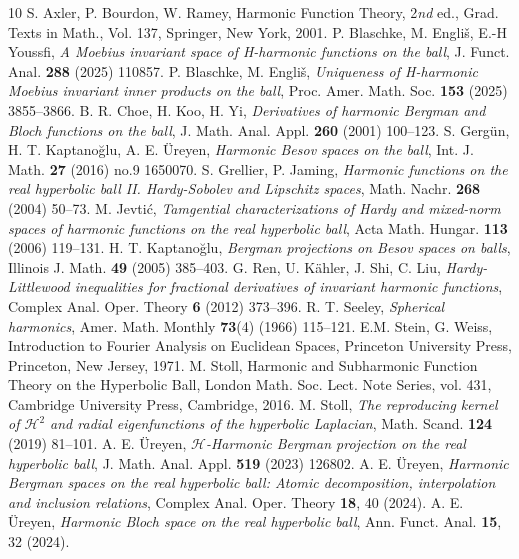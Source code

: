 \documentclass{amsart}
\theoremstyle{definition}
\theoremstyle{remark}
\begin{document}
\begin{thebibliography}{10}
%
S. Axler, P. Bourdon, W. Ramey,
Harmonic Function Theory,
2\textit{nd} ed., Grad. Texts in Math., Vol. 137, Springer, New York, 2001.
%
P. Blaschke, M. Engli\v{s}, E.-H Youssfi,
\textit{A Moebius invariant space of H-harmonic functions on the ball},
J. Funct. Anal. \textbf{288} (2025) 110857.
%
P. Blaschke, M. Engli\v{s},
\textit{Uniqueness of H-harmonic Moebius invariant inner products on the ball},
Proc. Amer. Math. Soc. \textbf{153} (2025) 3855--3866.
%
B. R. Choe, H. Koo, H. Yi,
\textit{Derivatives of harmonic Bergman and Bloch functions on the ball},
J. Math. Anal. Appl. \textbf{260} (2001) 100--123.
%
S. Gerg\"{u}n, H. T. Kaptano\u glu, A. E. \"Ureyen,
\textit{Harmonic Besov spaces on the ball},
Int. J. Math. \textbf{27} (2016) no.9 1650070.
%
S. Grellier, P. Jaming,
\textit{Harmonic functions on the real hyperbolic ball II.
Hardy-Sobolev and Lipschitz spaces},
Math. Nachr. \textbf{268} (2004) 50--73.
%
M. Jevti\'{c},
\textit{Tamgential characterizations of Hardy and mixed-norm
spaces of harmonic functions on the real hyperbolic ball},
Acta Math. Hungar. \textbf{113} (2006) 119--131.
%
H. T. Kaptano\u glu,
\textit{Bergman projections on Besov spaces on balls},
Illinois J. Math. \textbf{49} (2005) 385--403.
%
G. Ren, U. K\"{a}hler, J. Shi, C. Liu,
\textit{Hardy-Littlewood inequalities for fractional derivatives
of invariant harmonic functions},
Complex Anal. Oper. Theory \textbf{6} (2012) 373--396.
%
R. T. Seeley,
\textit{Spherical harmonics},
Amer. Math. Monthly \textbf{73}(4) (1966) 115--121.
%
E.M. Stein, G. Weiss,
Introduction to Fourier Analysis on Euclidean Spaces,
Princeton University Press, Princeton, New Jersey, 1971.
%
M. Stoll,
Harmonic and Subharmonic Function Theory on the Hyperbolic Ball,
London Math. Soc. Lect. Note Series, vol. 431,
Cambridge University Press, Cambridge, 2016.
%
M. Stoll,
\textit{The reproducing kernel of $\mathcal{H}^2$ and radial eigenfunctions
of the hyperbolic Laplacian},
Math. Scand. \textbf{124} (2019) 81--101.
%
A. E. \"Ureyen,
\textit{$\mathcal H$-Harmonic Bergman projection on the real hyperbolic ball},
J. Math. Anal. Appl. \textbf{519} (2023) 126802.
%
A. E. \"Ureyen,
\textit{Harmonic Bergman spaces on the real hyperbolic ball:
Atomic decomposition, interpolation and inclusion relations},
Complex Anal. Oper. Theory \textbf{18}, 40 (2024).
%
A. E. \"Ureyen,
\textit{Harmonic Bloch space on the real hyperbolic ball},
Ann. Funct. Anal. \textbf{15}, 32 (2024).
%
\end{thebibliography}
\end{document}
